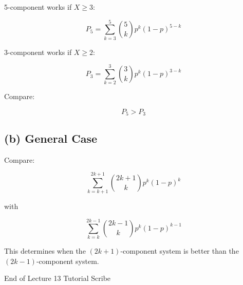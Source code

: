 \documentclass[11pt]{article}
\begin{document}
5-component works if $X \ge 3$:

\[
P_5=\sum_{k=3}^{5}\binom{5}{k}p^k(1-p)^{5-k}
\]

3-component works if $X \ge 2$:

\[
P_3=\sum_{k=2}^{3}\binom{3}{k}p^k(1-p)^{3-k}
\]

Compare:

\[
P_5>P_3
\]

\subsection*{\textbf{(b) General Case}}

Compare:

\[
\sum_{k=k+1}^{2k+1}\binom{2k+1}{k}p^k(1-p)^k
\]

with

\[
\sum_{k=k}^{2k-1}\binom{2k-1}{k}p^k(1-p)^{k-1}
\]

This determines when the $(2k+1)$-component system is better than the $(2k-1)$-component system.

End of Lecture 13 Tutorial Scribe
\end{document}
